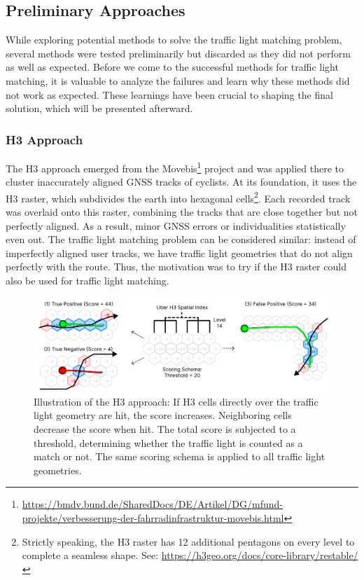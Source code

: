 \subsection{Preliminary Approaches}

While exploring potential methods to solve the traffic light matching problem, several methods were tested preliminarily but discarded as they did not perform as well as expected. Before we come to the successful methods for traffic light matching, it is valuable to analyze the failures and learn why these methods did not work as expected. These learnings have been crucial to shaping the final solution, which will be presented afterward.

\subsubsection{H3 Approach}

The H3 approach emerged from the Movebis\footnote{\url{https://bmdv.bund.de/SharedDocs/DE/Artikel/DG/mfund-projekte/verbesserung-der-fahrradinfrastruktur-movebis.html}} project and was applied there to cluster inaccurately aligned GNSS tracks of cyclists. At its foundation, it uses the H3 raster, which subdivides the earth into hexagonal cells\footnote{Strictly speaking, the H3 raster has 12 additional pentagons on every level to complete a seamless shape. See: \url{https://h3geo.org/docs/core-library/restable/}}. Each recorded track was overlaid onto this raster, combining the tracks that are close together but not perfectly aligned. As a result, minor GNSS errors or individualities statistically even out. The traffic light matching problem can be considered similar: instead of imperfectly aligned user tracks, we have traffic light geometries that do not align perfectly with the route. Thus, the motivation was to try if the H3 raster could also be used for traffic light matching.

\begin{figure}[t]
\centering
\includegraphics[width=\linewidth]{images/sg-selection-h3-approach.pdf}
\caption{Illustration of the H3 approach: If H3 cells directly over the traffic light geometry are hit, the score increases. Neighboring cells decrease the score when hit. The total score is subjected to a threshold, determining whether the traffic light is counted as a match or not. The same scoring schema is applied to all traffic light geometries.}
\label{fig:sg-selection-h3-approach}
\end{figure}


